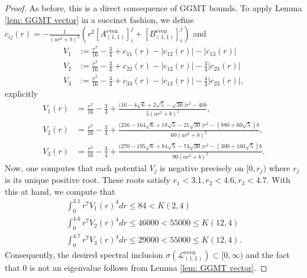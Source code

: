 \documentclass[11pt,reqno]{amsart}
\theoremstyle{remark}
\theoremstyle{definition}
\begin{document}
\begin{proof}
 As before, this is  a direct consequence of GGMT bounds. To apply Lemma \ref{lem: GGMT vector} in a succinct fashion, we define $c_{ij}(r)=-\frac{1}{( ar^2+b)^2}\left(r^2 [A_{(1,1)}^{\mathrm{even}}]_i^j+[B_{(1,1)}^{\mathrm{even}}]^j_i\right) $ and
 \begin{align*}
 V_1&:=\frac{r^2}{16}-\frac{3}{4}+ c_{11}(r)- |c_{12}(r)|- |c_{13}(r)|
 \\
 V_2&:= \frac{r^2}{16}-\frac{3}{4}+c_{22}(r)- |c_{12}(r)|- \frac{3}{4}|c_{23}(r)|
 \\
 V_3&:=\frac{r^2}{16}-\frac{3}{4}+ c_{33}(r)- |c_{13}(r)|- \frac{4}{3}|c_{23}(r)|,
 \end{align*}
explicitly
\begin{align*}
V_1(r)&=\frac{r^2}{16}-\frac34
  +\frac{\bigl(16-4\sqrt6+2\sqrt5-\sqrt{30}\bigr)r^2-40b}
        {5(ar^2+b)^2},
\\
V_2(r)&=\frac{r^2}{16}-\frac34 +\frac{\bigl(216-164\sqrt6+18\sqrt5-21\sqrt{30}\bigr)r^2 -(880+60\sqrt5)b}{60(ar^2+b)^2},
\\
V_3(r)&=\frac{r^2}{16}-\frac34+\frac{\bigl(270-195\sqrt6+84\sqrt5-74\sqrt{30}\bigr)r^2 -(300+160\sqrt5)b}{90(ar^2+b)^2}.
\end{align*}
Now, one computes that each potential $V_j$ is negative precisely on $[0,r_j)$  where $r_j$ is its unique positive root.
These roots satisfy $r_1< 3.1, r_2<4.6, r_3< 4.7$. With this at hand, we compute that
\begin{align*}
 \int_0^{3.1} r^7 V_1(r)^4dr \leq  84<  K(2,4)
 \\
  \int_0^{4.6} r^7 V_2(r)^4dr \leq  46000<  55000 \leq K(12,4)
  \\
    \int_0^{4.7} r^7 V_3(r)^4dr \leq  29000< 55000 \leq K(12,4).
\end{align*}
Consequently, the desired spectral inclusion $\sigma( \mathcal{L}_{(1,1)}^{\mathrm{even}})\subset [0,\infty)$ and the fact that $0$ is not an eigenvalue follows from Lemma \ref{lem: GGMT vector}.
\end{proof}
\end{document}
